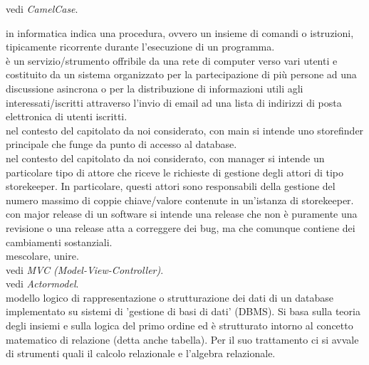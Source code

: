 \documentclass{scalatekids-article}
\begin{document}
   vedi \textit{CamelCase}.
  \\


   in informatica indica una procedura, ovvero un insieme di comandi o istruzioni, tipicamente ricorrente durante l'esecuzione di un programma.
  \\

   è un servizio/strumento offribile da una rete di computer verso vari utenti e costituito da un sistema organizzato per la partecipazione di più persone ad una discussione asincrona o per la distribuzione di informazioni utili agli interessati/iscritti attraverso l'invio di email ad una lista di indirizzi di posta elettronica di utenti iscritti.
  \\

   nel contesto del capitolato da noi considerato, con main si intende uno storefinder principale che funge da punto di accesso al database.
  \\
  
   nel contesto del capitolato da noi considerato, con manager si intende un particolare tipo di attore che riceve le richieste di gestione degli attori di tipo storekeeper. In particolare, questi attori sono responsabili della gestione del numero massimo di coppie chiave/valore contenute in un’istanza di storekeeper.
  \\

   con major release di un software si intende una release che non è puramente una revisione o una release atta a correggere dei bug, ma che comunque contiene dei cambiamenti sostanziali.
  \\

   mescolare, unire.
  \\
  
   vedi \textit{MVC (Model-View-Controller)}.
  \\

   vedi \textit{Actormodel}.
  \\

   modello logico di rappresentazione o strutturazione dei dati di un database implementato su sistemi di 'gestione di basi di dati' (DBMS).
  Si basa sulla teoria degli insiemi e sulla logica del primo ordine ed è strutturato intorno al concetto matematico di relazione (detta anche tabella). Per il suo trattamento ci si avvale di strumenti quali il calcolo relazionale e l'algebra relazionale.
  \\
  
\end{document}
